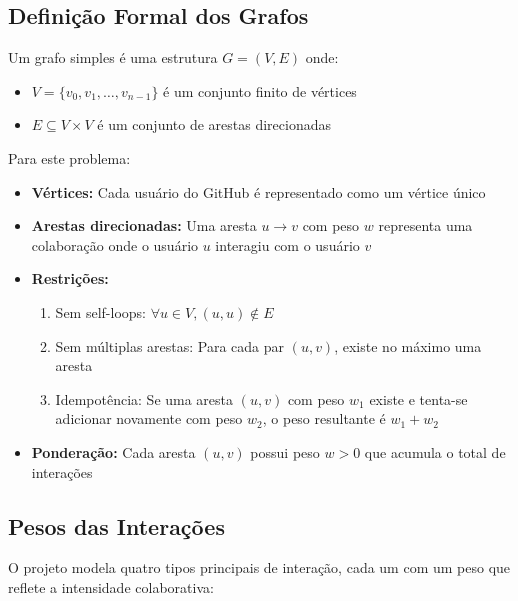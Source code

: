 \documentclass[12pt,a4paper]{article}
\begin{document}
\subsection{Definição Formal dos Grafos}

Um grafo simples é uma estrutura $G = (V, E)$ onde:
\begin{itemize}
  \item $V = \{v_0, v_1, \ldots, v_{n-1}\}$ é um conjunto finito de vértices
  \item $E \subseteq V \times V$ é um conjunto de arestas direcionadas
\end{itemize}

Para este problema:
\begin{itemize}
  \item \textbf{Vértices:} Cada usuário do GitHub é representado como um vértice único
  \item \textbf{Arestas direcionadas:} Uma aresta $u \to v$ com peso $w$ representa uma colaboração onde o usuário $u$ interagiu com o usuário $v$
  \item \textbf{Restrições:}
    \begin{enumerate}
      \item Sem self-loops: $\forall u \in V, (u, u) \notin E$
      \item Sem múltiplas arestas: Para cada par $(u, v)$, existe no máximo uma aresta
      \item Idempotência: Se uma aresta $(u, v)$ com peso $w_1$ existe e tenta-se adicionar novamente com peso $w_2$, o peso resultante é $w_1 + w_2$
    \end{enumerate}
  \item \textbf{Ponderação:} Cada aresta $(u, v)$ possui peso $w > 0$ que acumula o total de interações
\end{itemize}

\subsection{Pesos das Interações}

O projeto modela quatro tipos principais de interação, cada um com um peso que reflete a intensidade colaborativa:
\end{document}
